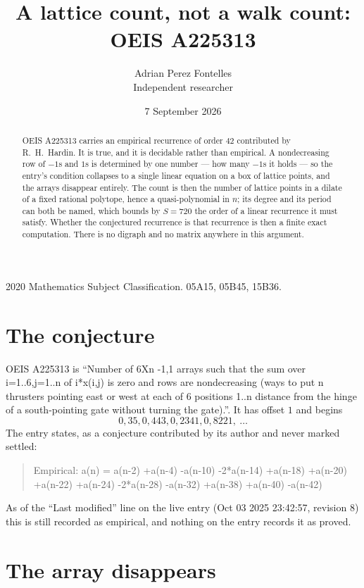 \documentclass[11pt,a4paper]{article}
\title{A lattice count, not a walk count: OEIS A225313}
\author{Adrian Perez Fontelles\\ \small Independent researcher}
\date{7 September 2026}
\theoremstyle{plain}
\theoremstyle{definition}
\begin{document}
\maketitle

\begin{abstract}
OEIS A225313 carries an empirical recurrence of order $42$ contributed by R.~H.~Hardin. It is
true, and it is decidable rather than empirical. A nondecreasing row of $-1$s and $1$s is
determined by one number --- how many $-1$s it holds --- so the entry's condition collapses to
a single linear equation on a box of lattice points, and the arrays disappear entirely. The
count is then the number of lattice points in a dilate of a fixed rational polytope, hence a
quasi-polynomial in $n$; its degree and its period can both be named, which bounds by
$S=720$ the order of a linear recurrence it must satisfy. Whether the conjectured recurrence
is that recurrence is then a finite exact computation. There is no digraph and no matrix
anywhere in this argument.
\end{abstract}

\noindent\small 2020 Mathematics Subject Classification. 05A15, 05B45, 15B36.\normalsize

\section{The conjecture}

OEIS A225313 is ``Number of 6Xn -1,1 arrays such that the sum over i=1..6,j=1..n of i*x(i,j) is zero and rows are nondecreasing (ways to put n thrusters pointing east or west at each of 6 positions 1..n distance from the hinge of a south-pointing gate without turning the gate).''. It has offset $1$ and begins
\[
0, 35, 0, 443, 0, 2341, 0, 8221,\ \dots
\]
The entry states, as a conjecture contributed by its author and never marked settled:
\begin{quote}
Empirical: a(n) = a(n-2) +a(n-4) -a(n-10) -2*a(n-14) +a(n-18) +a(n-20) +a(n-22) +a(n-24) -2*a(n-28) -a(n-32) +a(n-38) +a(n-40) -a(n-42)
\end{quote}
As of the ``Last modified'' line on the live entry (Oct 03 2025 23:42:57, revision 8) this is still
recorded as empirical, and nothing on the entry records it as proved.

\section{The array disappears}
\end{document}
